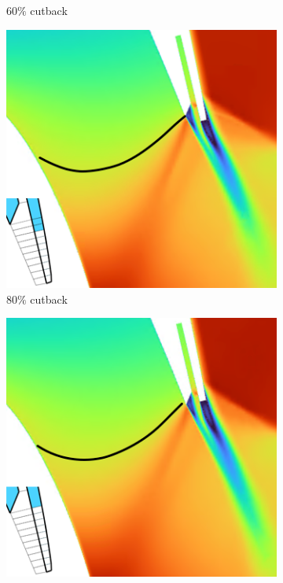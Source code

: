\documentclass[a4paper, 11pt, oneside]{report}
\begin{document}
\begin{figure}[H]
\begin{subfigure}{.45\textwidth}
		\caption{$60\%$ cutback}
		\vspace{0.018\textheight}
	\end{subfigure}
	\begin{subfigure}{.45\textwidth}
		\centering
		\includegraphics[width=\linewidth]{figs/ss_cutbacks_m1_lines_8.png}
		\caption{$80\%$ cutback}
	\end{subfigure}
	\hspace{0.05\textwidth}
	\begin{subfigure}{.45\textwidth}
		\centering
		\includegraphics[width=\linewidth]{figs/ss_cutbacks_m1_lines_10.png}

\end{subfigure}
\end{figure}
\end{document}
